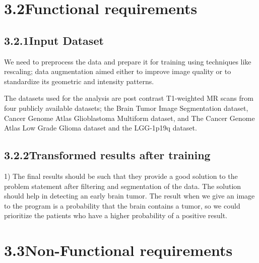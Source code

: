 \documentclass[oneside,a4paper,12pt]{book}
\begin{document}
\section*{3.2\hspace*{10pt}Functional requirements}
\subsection*{3.2.1\hspace*{10pt}Input Dataset}
 \item
We need to preprocess the data and prepare it for training using techniques like rescaling; data augmentation aimed either to improve image quality or to standardize its geometric and intensity patterns.

\par
\item
The datasets used for the analysis are post contrast T1-weighted MR scans from four publicly available datasets; the Brain Tumor Image Segmentation dataset, Cancer Genome Atlas Glioblastoma Multiform dataset, and The Cancer Genome Atlas Low Grade Glioma dataset and the LGG-1p19q dataset.
\par


\vspace{\baselineskip}
\subsection*{3.2.2\hspace*{10pt}Transformed results after training}
\item
	   \hspace{0.5}1) The final results should be such that they provide a good solution to the problem statement after filtering and segmentation of the data. The solution should help in detecting an early brain tumor. 
	The result when we give an image to the program is a probability that the brain contains a tumor, so we could prioritize the patients who have a higher probability of a positive result.



\section*{3.3\hspace*{10pt}Non-Functional requirements}
\end{document}
